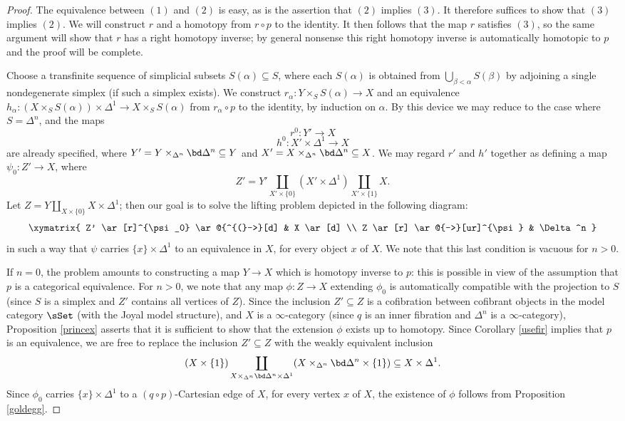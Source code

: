 \begin{proof}
The equivalence between $(1)$ and $(2)$ is easy, as is the assertion that $(2)$ implies $(3)$. It therefore suffices to show that $(3)$ implies $(2)$. We will construct $r$ and a homotopy from $r \circ p$ to the identity. It then follows that the map $r$ satisfies $(3)$, so the same argument will show that $r$ has a right homotopy inverse; by general nonsense this right homotopy inverse is automatically homotopic to $p$ and the proof will be complete.

Choose a transfinite sequence of simplicial subsets $S(\alpha) \subseteq S$, where each
$S(\alpha)$ is obtained from $\bigcup_{ \beta < \alpha} S(\beta)$ by adjoining a single
nondegenerate simplex (if such a simplex exists).
We construct
$r_{\alpha}: Y \times_{S} S(\alpha) \rightarrow X$ and an equivalence $h_{\alpha}: (X \times_{S} S(\alpha) ) \times \Delta^1\rightarrow X \times_{S} S(\alpha)$ from $r_{\alpha} \circ p$ to the identity, by induction on $\alpha$. By this device we may reduce to the case where $S = \Delta^n$, and the maps
$$r^0: Y' \rightarrow X$$
$$h^0: X' \times \Delta^1 \rightarrow X$$ 
are already specified, where $Y' = Y \times_{\Delta^n} \bd \Delta^n \subseteq Y$ and
$X' = X \times_{\Delta^n} \bd \Delta^n \subseteq X$. We may regard $r'$ and $h'$ together as defining a map
$\psi_0: Z'  \rightarrow X$, where
$$Z' = Y' \coprod_{ X' \times \{0\} } (X' \times \Delta^1) \coprod_{ X' \times \{1\} } X.$$
Let $Z = Y \coprod_{ X \times \{0\} } X \times \Delta^1$; then our goal is to solve the lifting problem depicted in the following diagram:
$$ \xymatrix{ Z' \ar[r]^{\psi_0} \ar@{^{(}->}[d] & X \ar[d] \\
Z \ar[r] \ar@{-->}[ur]^{\psi} & \Delta^n }$$
in such a way that $\psi$ carries $\{x\} \times \Delta^1$ to an equivalence in $X$, for
every object $x$ of $X$. We note that this last condition is vacuous for $n > 0$.

If $n=0$, the problem amounts to constructing a map $Y \rightarrow X$ which is homotopy inverse to $p$: this is possible in view of the assumption that $p$ is a categorical equivalence.
For $n > 0$, we note that any map $\phi: Z \rightarrow X$ extending $\phi_0$ is automatically compatible with the projection to $S$ (since $S$ is a simplex and $Z'$ contains all vertices of $Z$). 
Since the inclusion $Z' \subseteq Z$ is a cofibration between cofibrant objects in the model category $\sSet$ (with the Joyal model structure), and $X$ is a $\infty$-category (since $q$ is an inner fibration and $\Delta^n$ is a $\infty$-category), Proposition \ref{princex} asserts that it is sufficient to show that the extension $\phi$ exists up to homotopy. Since Corollary \ref{usefir} implies that $p$ is an equivalence, we are free to replace the inclusion $Z' \subseteq Z$ with the weakly equivalent inclusion
$$ (X \times \{1\}) \coprod_{ X \times_{ \Delta^n} \bd\Delta^n \times \Delta^1 }
(X \times_{\Delta^n} \bd \Delta^n \times \{1\}) \subseteq X \times \Delta^1.$$
Since $\phi_0$ carries $\{x\} \times \Delta^1$ to a $(q \circ p)$-Cartesian edge of $X$, for
every vertex $x$ of $X$, the existence of $\phi$ follows from Proposition \ref{goldegg}.
\end{proof}

